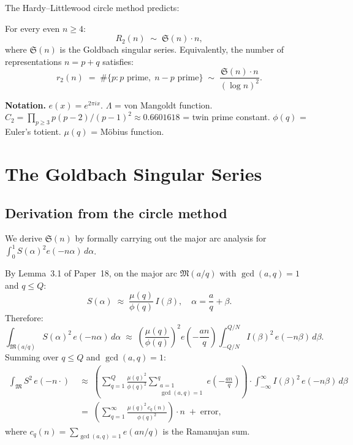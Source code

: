 \documentclass[12pt,a4paper]{amsart}
\theoremstyle{definition}
\newcommand{\eq}[1]{e\!\left(#1\right)}
\begin{document}
The Hardy--Littlewood circle method predicts:

\begin{conjecture}\label{conj:HL}
  For every even $n \geq 4$:
  \[
    R_2(n) \;\sim\; \mathfrak{S}(n) \cdot n,
  \]
  where $\mathfrak{S}(n)$ is the Goldbach singular series.  Equivalently,
  the number of representations $n = p + q$ satisfies:
  \[
    r_2(n) \;=\; \#\{p : p \text{ prime},\; n-p \text{ prime}\}
    \;\sim\; \frac{\mathfrak{S}(n) \cdot n}{(\log n)^2}.
  \]
\end{conjecture}

\textbf{Notation.}  $\eq{x} = e^{2\pi ix}$.  $\Lambda$ = von Mangoldt function.
$C_2 = \prod_{p \geq 3} p(p-2)/(p-1)^2 \approx 0.6601618$ = twin prime constant.
$\phi(q)$ = Euler's totient.  $\mu(q)$ = M\"obius function.

\section{The Goldbach Singular Series}
\label{sec:singular}

\subsection{Derivation from the circle method}

We derive $\mathfrak{S}(n)$ by formally carrying out the major arc
analysis for $\int_0^1 S(\alpha)^2 \eq{-n\alpha}\, d\alpha$.

By Lemma~3.1 of Paper~18, on the major arc $\mathfrak{M}(a/q)$ with
$\gcd(a,q)=1$ and $q \leq Q$:
\[
  S(\alpha) \;\approx\; \frac{\mu(q)}{\phi(q)}\, I(\beta),
  \quad \alpha = \frac{a}{q} + \beta.
\]
Therefore:
\[
  \int_{\mathfrak{M}(a/q)} S(\alpha)^2\, \eq{-n\alpha}\, d\alpha
  \;\approx\; \left(\frac{\mu(q)}{\phi(q)}\right)^2 \eq{-\frac{an}{q}}
               \int_{-Q/N}^{Q/N} I(\beta)^2\, \eq{-n\beta}\, d\beta.
\]
Summing over $q \leq Q$ and $\gcd(a,q)=1$:
\begin{align*}
  \int_{\mathfrak{M}} S^2\, \eq{-n\cdot}
  &\;\approx\; \left(\sum_{q=1}^{Q} \frac{\mu(q)^2}{\phi(q)^2}
                \sum_{\substack{a=1\\ \gcd(a,q)=1}}^{q} \eq{-\frac{an}{q}}\right)
               \cdot \int_{-\infty}^{\infty} I(\beta)^2\, \eq{-n\beta}\, d\beta \\
  &\;=\; \left(\sum_{q=1}^{\infty} \frac{\mu(q)^2\, c_q(n)}{\phi(q)^2}\right)
          \cdot n \;+\; \text{error},
\end{align*}
where $c_q(n) = \sum_{\gcd(a,q)=1} \eq{an/q}$ is the Ramanujan sum.
\end{document}
